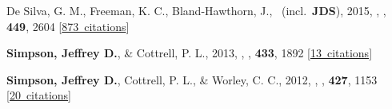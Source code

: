 \item[{\color{numcolor}\scriptsize3}] De Silva, G. M., Freeman, K. C., Bland-Hawthorn, J., \etal\ (incl.\ \textbf{JDS}), 2015, , \mnras, \textbf{449}, 2604 [\href{https://ui.adsabs.harvard.edu/#abs/2015MNRAS.449.2604D}{873~citations}]

\item[{\color{numcolor}\scriptsize2}] \textbf{Simpson, Jeffrey D.}, \& Cottrell, P. L., 2013, , \mnras, \textbf{433}, 1892 [\href{https://ui.adsabs.harvard.edu/#abs/2013MNRAS.433.1892S}{13~citations}]

\item[{\color{numcolor}\scriptsize1}] \textbf{Simpson, Jeffrey D.}, Cottrell, P. L., \& Worley, C. C., 2012, , \mnras, \textbf{427}, 1153 [\href{https://ui.adsabs.harvard.edu/#abs/2012MNRAS.427.1153S}{20~citations}]